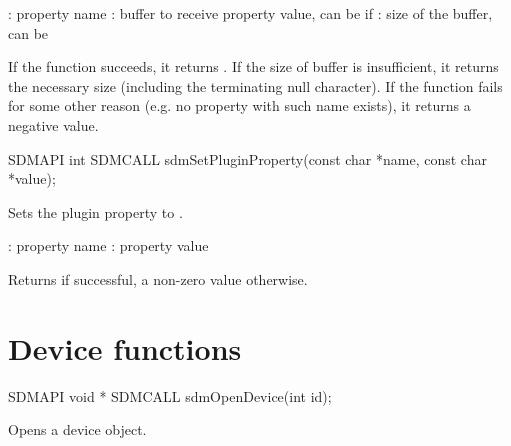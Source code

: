 \documentclass[a4paper,12pt,twoside,extrafontsizes]{memoir}
\begin{document}
\begin{funcparams}
	: property name
	: buffer to receive property value, can be  if 
	: size of the buffer, can be 
\end{funcparams}

\begin{funcret}
	If the function succeeds, it returns . If the size of buffer is insufficient, it returns the necessary size (including the terminating null character). If the function fails for some other reason (e.g. no property with such name exists), it returns a negative value.
\end{funcret}



\begin{cfuncprototype}
SDMAPI int SDMCALL sdmSetPluginProperty(const char *name, const char *value);
\end{cfuncprototype}

\begin{funcdescr}
	Sets the plugin property  to .
\end{funcdescr}

\begin{funcparams}
	: property name
	: property value
\end{funcparams}

\begin{funcret}
	Returns  if successful, a non-zero value otherwise.
\end{funcret}

\section{Device functions}



\begin{cfuncprototype}
SDMAPI void * SDMCALL sdmOpenDevice(int id);
\end{cfuncprototype}

\begin{funcdescr}
	Opens a device object.
\end{funcdescr}
\end{document}
